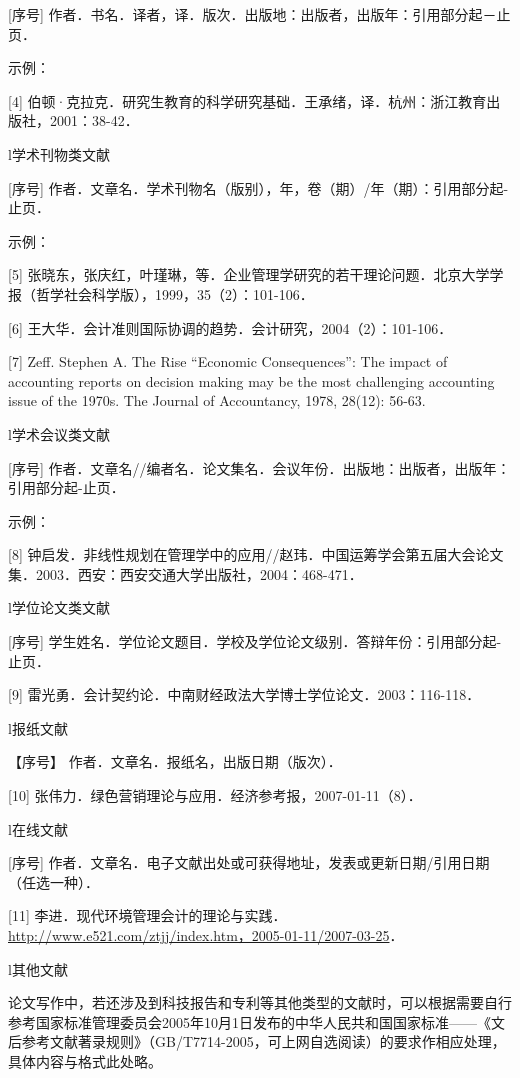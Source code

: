 \documentclass[singlesided]{Style/ucasthesis}%
\begin{document}
{[}序号{]} 作者．书名．译者，译．版次．出版地：出版者，出版年：引用部分起－止页．

示例：

{[}4{]} 伯顿·克拉克．研究生教育的科学研究基础．王承绪，译．杭州：浙江教育出版社，2001：38-42．

l学术刊物类文献

{[}序号{]} 作者．文章名．学术刊物名（版别），年，卷（期）/年（期）：引用部分起-止页．

示例：

{[}5{]} 张晓东，张庆红，叶瑾琳，等．企业管理学研究的若干理论问题．北京大学学报（哲学社会科学版），1999，35（2）：101-106．

{[}6{]} 王大华．会计准则国际协调的趋势．会计研究，2004（2）：101-106．

{[}7{]} Zeff. Stephen A. The Rise ``Economic Consequences'': The impact of accounting reports on decision making may be the most challenging accounting issue of the 1970s. The Journal of Accountancy, 1978, 28(12): 56-63.

l学术会议类文献

{[}序号{]} 作者．文章名//编者名．论文集名．会议年份．出版地：出版者，出版年：引用部分起-止页．

示例：

{[}8{]} 钟启发．非线性规划在管理学中的应用//赵玮．中国运筹学会第五届大会论文集．2003．西安：西安交通大学出版社，2004：468-471．

l学位论文类文献

{[}序号{]} 学生姓名．学位论文题目．学校及学位论文级别．答辩年份：引用部分起-止页．

{[}9{]} 雷光勇．会计契约论．中南财经政法大学博士学位论文．2003：116-118．

l报纸文献

【序号】 作者．文章名．报纸名，出版日期（版次）．

{[}10{]} 张伟力．绿色营销理论与应用．经济参考报，2007-01-11（8）．

l在线文献

{[}序号{]} 作者．文章名．电子文献出处或可获得地址，发表或更新日期/引用日期（任选一种）．

{[}11{]} 李进．现代环境管理会计的理论与实践．\url{http://www.e521.com/ztjj/index.htm，2005-01-11/2007-03-25}．

l其他文献

论文写作中，若还涉及到科技报告和专利等其他类型的文献时，可以根据需要自行参考国家标准管理委员会2005年10月1日发布的中华人民共和国国家标准------《文后参考文献著录规则》（GB/T7714-2005，可上网自选阅读）的要求作相应处理，具体内容与格式此处略。
\end{document}
